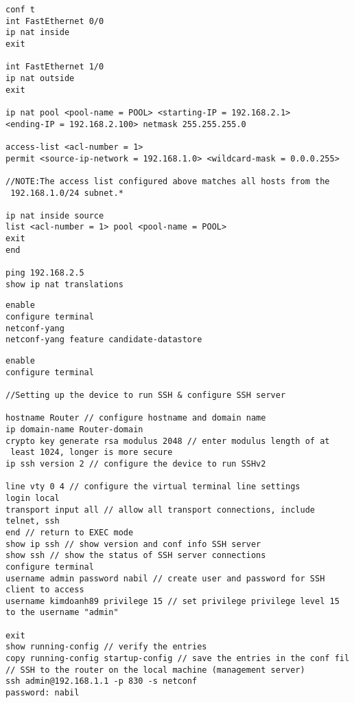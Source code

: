 \begin{lstlisting}[style=cliStyle, caption={Configure NAT.},  backgroundcolor=\color{codebackground}]
conf t
int FastEthernet 0/0
ip nat inside
exit

int FastEthernet 1/0
ip nat outside
exit

ip nat pool <pool-name = POOL> <starting-IP = 192.168.2.1> 
<ending-IP = 192.168.2.100> netmask 255.255.255.0 

access-list <acl-number = 1>
permit <source-ip-network = 192.168.1.0> <wildcard-mask = 0.0.0.255>

//NOTE:The access list configured above matches all hosts from the
 192.168.1.0/24 subnet.*

ip nat inside source
list <acl-number = 1> pool <pool-name = POOL>
exit
end 

ping 192.168.2.5
show ip nat translations
\end{lstlisting}
\begin{lstlisting}[style=cliStyle, caption={Configure NETCONF.},  backgroundcolor=\color{codebackground}]
enable
configure terminal
netconf-yang
netconf-yang feature candidate-datastore
\end{lstlisting}

\begin{lstlisting}[style=cliStyle, caption={Configure SSH.},  backgroundcolor=\color{codebackground}]
enable
configure terminal

//Setting up the device to run SSH & configure SSH server

hostname Router // configure hostname and domain name
ip domain-name Router-domain
crypto key generate rsa modulus 2048 // enter modulus length of at
 least 1024, longer is more secure
ip ssh version 2 // configure the device to run SSHv2

line vty 0 4 // configure the virtual terminal line settings
login local
transport input all // allow all transport connections, include telnet, ssh
end // return to EXEC mode
show ip ssh // show version and conf info SSH server
show ssh // show the status of SSH server connections
configure terminal
username admin password nabil // create user and password for SSH 
client to access
username kimdoanh89 privilege 15 // set privilege privilege level 15 
to the username "admin"

exit
show running-config // verify the entries
copy running-config startup-config // save the entries in the conf fil
// SSH to the router on the local machine (management server)
ssh admin@192.168.1.1 -p 830 -s netconf
password: nabil
\end{lstlisting}